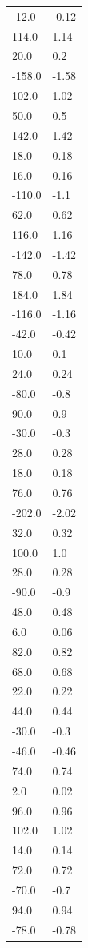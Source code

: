 \begin{longtable}{ll}
-12.0 & -0.12 \\
114.0 & 1.14 \\
20.0 & 0.2 \\
-158.0 & -1.58 \\
102.0 & 1.02 \\
50.0 & 0.5 \\
142.0 & 1.42 \\
18.0 & 0.18 \\
16.0 & 0.16 \\
-110.0 & -1.1 \\
62.0 & 0.62 \\
116.0 & 1.16 \\
-142.0 & -1.42 \\
78.0 & 0.78 \\
184.0 & 1.84 \\
-116.0 & -1.16 \\
-42.0 & -0.42 \\
10.0 & 0.1 \\
24.0 & 0.24 \\
-80.0 & -0.8 \\
90.0 & 0.9 \\
-30.0 & -0.3 \\
28.0 & 0.28 \\
18.0 & 0.18 \\
76.0 & 0.76 \\
-202.0 & -2.02 \\
32.0 & 0.32 \\
100.0 & 1.0 \\
28.0 & 0.28 \\
-90.0 & -0.9 \\
48.0 & 0.48 \\
6.0 & 0.06 \\
82.0 & 0.82 \\
68.0 & 0.68 \\
22.0 & 0.22 \\
44.0 & 0.44 \\
-30.0 & -0.3 \\
-46.0 & -0.46 \\
74.0 & 0.74 \\
2.0 & 0.02 \\
96.0 & 0.96 \\
102.0 & 1.02 \\
14.0 & 0.14 \\
72.0 & 0.72 \\
-70.0 & -0.7 \\
94.0 & 0.94 \\
-78.0 & -0.78 \\

\end{longtable}
